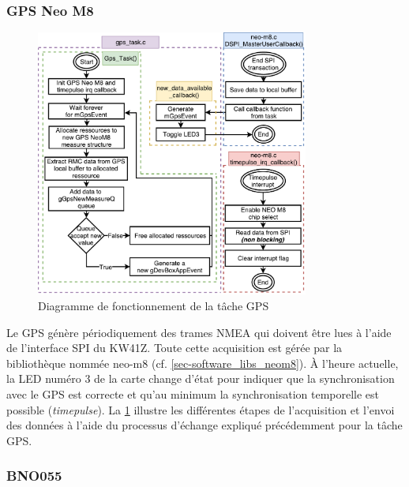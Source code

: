 \FloatBarrier
\subsubsection{GPS Neo M8}
\label{sec-software_kw41z_algo_gps}


\begin{figure}[ht!]
    \centering
    \includegraphics[width=0.8\textwidth]{Figures/Software/diagram_gps_neo.pdf}
    \caption{Diagramme de fonctionnement de la tâche GPS}
    \label{fig-diagram_gps_neo}
\end{figure}

Le GPS génère périodiquement des trames NMEA qui doivent être lues à l'aide de l'interface SPI du KW41Z. Toute cette acquisition est gérée par la bibliothèque nommée neo-m8 (cf. \cref{sec-software_libs_neom8}). À l'heure actuelle, la LED numéro 3 de la carte change d'état pour indiquer que la synchronisation avec le GPS est correcte et qu'au minimum la synchronisation temporelle est possible (\textit{timepulse}). La \cref{fig-diagram_gps_neo} illustre les différentes étapes de l'acquisition et l'envoi des données à l'aide du processus d'échange expliqué précédemment pour la tâche GPS.


\FloatBarrier
\subsubsection{BNO055}


